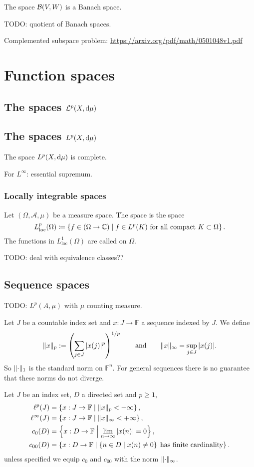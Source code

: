 The space $\operatorname{\mathcal{B}}(V,W)$ is a Banach space.

TODO: quotient of Banach spaces.

Complemented subspace problem: \url{https://arxiv.org/pdf/math/0501048v1.pdf}

\section{Function spaces}
\subsection{The spaces $\mathcal{L}^p(X,\operatorname{d \!}{\mu})$}
\subsection{The spaces $L^p(X,\operatorname{d \!}{\mu})$}
\begin{theorem}
The space $L^p(X,\operatorname{d \!}{\mu})$ is complete.
\end{theorem}

For $L^\infty$: essential supremum.

\subsubsection{Locally integrable spaces}
\begin{definition}
Let $(\Omega, \mathcal{A}, \mu)$ be a measure space. The  space is the space
\[ L^p_\text{loc}(\Omega) \coloneqq \left\{ f \in (\Omega\to\mathbb{C}) \;\middle|\; \text{$f\in L^p(K)$ for all compact $K\subset \Omega$} \right\}. \]
The functions in $L^1_\text{loc}(\Omega)$ are called  on $\Omega$.
\end{definition}
TODO: deal with equivalence classes??

\subsection{Sequence spaces}
TODO:  $L^p(A,\mu)$ with $\mu$ counting measure.

Let $J$ be a countable index set and $x:J\to \mathbb{F}$ a sequence indexed by $J$. We define
\[ \lVert x\rVert_p := \left(\sum_{j\in J}|x(j)|^p\right)^{1/p} \qquad\text{and}\qquad \lVert x\rVert_\infty = \sup_{j\in J}|x(j)|. \]
So $\lVert\cdot\rVert_1$ is the standard norm on $\mathbb{F}^n$. For general sequences there is no guarantee that these norms do not diverge.
\begin{definition}
Let $J$ be an index set, $D$ a directed set and $p\geq 1$,
\begin{align*}
\ell^p(J) &= \left\{ x:J\to \mathbb{F} \;\middle|\; \lVert x\rVert_p < +\infty \right\},\\
\ell^\infty(J) &= \left\{ x:J\to \mathbb{F} \;\middle|\; \lVert x\rVert_\infty < +\infty \right\},\\
c_0(D) &= \left\{ x:D\to \mathbb{F} \;\middle|\; \lim_{n\to\infty}|x(n)| = 0 \right\}, \\
c_{00}(D) &= \left\{ x:D\to \mathbb{F} \;\middle|\; \left\{ n\in D \;\middle|\; x(n)\neq 0 \right\}\;\text{has finite cardinality} \right\}.
\end{align*}
unless specified we equip $c_0$ and $c_{00}$ with the norm $\lVert\cdot\rVert_\infty$.
\end{definition}

